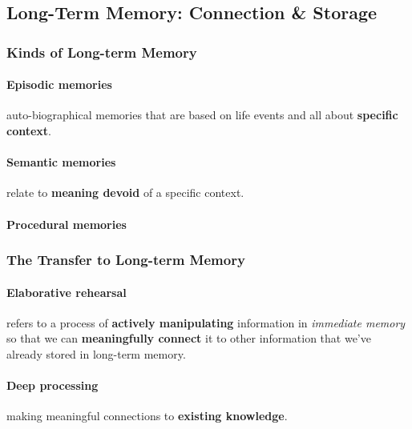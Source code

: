 \documentclass{article}
\begin{document}
	\subsection{Long-Term Memory: Connection \& Storage}
	\subsubsection{Kinds of Long-term Memory}
	\paragraph{Episodic memories} auto-biographical memories that are based on life events and all about \textbf{specific context}.
	\paragraph{Semantic memories} relate to \textbf{meaning devoid} of a specific context.
	\paragraph{Procedural memories}
	\subsubsection{The Transfer to Long-term Memory}
	\paragraph{Elaborative rehearsal} refers to a process of \textbf{actively manipulating} information in \emph{immediate memory} so that we can \textbf{meaningfully connect} it to other information that we've already stored in long-term memory.
	\paragraph{Deep processing} making meaningful connections to \textbf{existing knowledge}.
\end{document}
